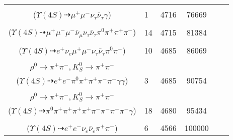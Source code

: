 \documentclass[landscape]{article}
\newcounter{rownumbers}
\newcommand\rn{\stepcounter{rownumbers}\arabic{rownumbers}}
\newcommand{\EOLP}{\\ \hline} %
\newcommand{\topoTags}[1]{#1} %
\begin{document}
\begin{longtable}{clcccc}
\rn & \makecell[l]{ $ 
\Upsilon(4S) \rightarrow B^{0} \bar{B}^{0} ,
B^{0} \rightarrow \mu^{+} \mu^{-} ,
\bar{B}^{0} \rightarrow \nu_{\tau} \bar{\nu}_{\tau} \gamma 
$ \\ ($
\Upsilon(4S) \dashrightarrow \mu^{+} \mu^{-} \nu_{\tau} \bar{\nu}_{\tau} \gamma 
$) } & \topoTags{1 & }4716 & 76669 \EOLP

\rn & \makecell[l]{ $ 
\Upsilon(4S) \rightarrow B^{0} \bar{B}^{0} ,
B^{0} \rightarrow \eta J/\psi ,
\bar{B}^{0} \rightarrow \tau^{-} \bar{\nu}_{\tau} \pi^{+} ,
\eta \rightarrow \pi^{0} \pi^{+} \pi^{-} ,
J/\psi \rightarrow \mu^{+} \mu^{-} ,
\tau^{-} \rightarrow \mu^{-} \bar{\nu}_{\mu} \nu_{\tau} 
$ \\ ($
\Upsilon(4S) \dashrightarrow \mu^{+} \mu^{-} \mu^{-} \bar{\nu}_{\mu} \nu_{\tau} \bar{\nu}_{\tau} \pi^{0} \pi^{+} \pi^{+} \pi^{-} 
$) } & \topoTags{14 & }4715 & 81384 \EOLP

\rn & \makecell[l]{ $ 
\Upsilon(4S) \rightarrow B^{0} \bar{B}^{0} ,
B^{0} \rightarrow \tau^{+} \nu_{\tau} \pi^{-} ,
\bar{B}^{0} \rightarrow \pi^{0} J/\psi ,
\tau^{+} \rightarrow e^{+} \nu_{e} \bar{\nu}_{\tau} ,
J/\psi \rightarrow \mu^{+} \mu^{-} 
$ \\ ($
\Upsilon(4S) \dashrightarrow e^{+} \nu_{e} \mu^{+} \mu^{-} \nu_{\tau} \bar{\nu}_{\tau} \pi^{0} \pi^{-} 
$) } & \topoTags{10 & }4685 & 86069 \EOLP

\rn & \makecell[l]{ $ 
\Upsilon(4S) \rightarrow B^{0} \bar{B}^{0} ,
B^{0} \rightarrow \eta X_{sd} ,
\bar{B}^{0} \rightarrow \pi^{0} J/\psi ,
\eta \rightarrow \gamma \gamma ,
X_{sd} \rightarrow \rho^{0} K_{S}^{0} ,
J/\psi \rightarrow e^{+} e^{-} ,
$ \\ $
\rho^{0} \rightarrow \pi^{+} \pi^{-} ,
K_{S}^{0} \rightarrow \pi^{+} \pi^{-} 
$ \\ ($
\Upsilon(4S) \dashrightarrow e^{+} e^{-} \pi^{0} \pi^{+} \pi^{+} \pi^{-} \pi^{-} \gamma \gamma 
$) } & \topoTags{3 & }4685 & 90754 \EOLP

\rn & \makecell[l]{ $ 
\Upsilon(4S) \rightarrow B^{0} \bar{B}^{0} ,
B^{0} \rightarrow \omega K_{S}^{0} ,
\bar{B}^{0} \rightarrow \bar{X}_{sd} \gamma ,
\omega \rightarrow \pi^{0} \pi^{+} \pi^{-} ,
K_{S}^{0} \rightarrow \pi^{+} \pi^{-} ,
\bar{X}_{sd} \rightarrow \rho^{0} K_{S}^{0} ,
$ \\ $
\rho^{0} \rightarrow \pi^{+} \pi^{-} ,
K_{S}^{0} \rightarrow \pi^{+} \pi^{-} 
$ \\ ($
\Upsilon(4S) \dashrightarrow \pi^{0} \pi^{+} \pi^{+} \pi^{+} \pi^{+} \pi^{-} \pi^{-} \pi^{-} \pi^{-} \gamma 
$) } & \topoTags{18 & }4680 & 95434 \EOLP

\rn & \makecell[l]{ $ 
\Upsilon(4S) \rightarrow B^{0} \bar{B}^{0} ,
B^{0} \rightarrow \nu_{e} \bar{\nu}_{e} K^{0} ,
\bar{B}^{0} \rightarrow e^{+} e^{-} ,
K^{0} \rightarrow K_{S}^{0} ,
K_{S}^{0} \rightarrow \pi^{+} \pi^{-} 
$ \\ ($
\Upsilon(4S) \dashrightarrow e^{+} e^{-} \nu_{e} \bar{\nu}_{e} \pi^{+} \pi^{-} 
$) } & \topoTags{6 & }4566 & 100000 \\ \hline

\end{longtable}
\end{document}
